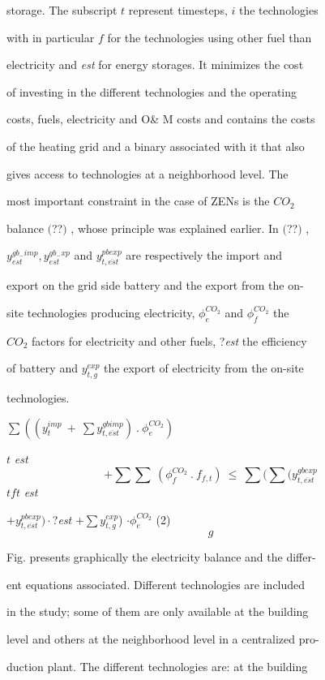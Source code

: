 \documentclass[a4paper,12pt]{article}
\begin{document}
storage. The subscript $t$ represent timesteps, $i$ the technologies

with in particular $f$ for the technologies using other fuel than

electricity and {\it est} for energy storages. It minimizes the cost

of investing in the different technologies and the operating

costs, fuels, electricity and O\& M costs and contains the costs

of the heating grid and a binary associated with it that also

gives access to technologies at a neighborhood level. The

most important constraint in the case of ZENs is the $CO_{2}$

balance $($??$)$ , whose principle was explained earlier. In $($??$)$ ,

$y_{est}^{gb_{-}imp}, y_{est}^{gb_{-}xp}$ and $y_{t,\overline{es}t}^{pbexp}$ are respectively the import and

export on the grid side battery and the export from the on-

site technologies producing electricity, $\phi_{e}^{CO_{2}}$ and $\phi_{f}^{CO_{2}}$ the

$CO_{2}$ factors for electricity and other fuels, ?{\it est} the efficiency

of battery and $y_{t,g}^{exp}$ the export of electricity from the on-site

technologies.

$\displaystyle \sum((y_{t}^{imp}\ +\ \sum y_{t,\overline{es}t}^{gbimp})\ .\ \phi_{e}^{CO_{2}})$

$t$ {\it est}
$$
+\sum\sum\ (\phi_{f}^{CO_{2}}\ .\ f_{f,t})\ \leq\ \sum(\sum(y_{t,\overline{es}t}^{gbexp}
$$
$t f t$ {\it est}
\begin{center}
$+y_{t,\overline{es}t}^{pbexp}) \cdot$?{\it est} $+\displaystyle \sum y_{t,g}^{exp}$) $\cdot \phi_{e}^{CO_{2}}$   (2)
$$
g
$$
\end{center}
Fig. presents graphically the electricity balance and the differ-

ent equations associated. Different technologies are included

in the study; some of them are only available at the building

level and others at the neighborhood level in a centralized pro-

duction plant. The different technologies are: at the building
\end{document}

